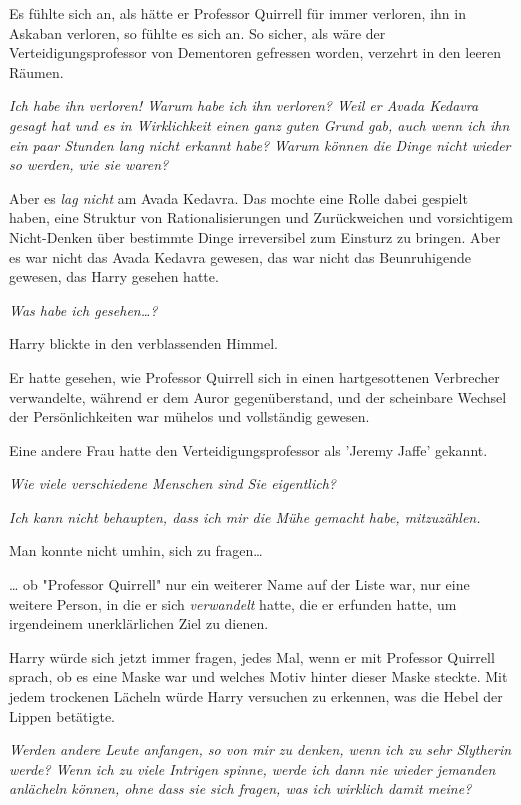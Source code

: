 {Es fühlte sich an, als hätte er Professor Quirrell für immer verloren, ihn in Askaban verloren, so fühlte es sich an. So sicher, als wäre der Verteidigungsprofessor von Dementoren gefressen worden, verzehrt in den leeren Räumen.

\emph{Ich habe ihn verloren! Warum habe ich ihn verloren? Weil er Avada Kedavra gesagt hat und es in Wirklichkeit einen ganz guten Grund gab, auch wenn ich ihn ein paar Stunden lang nicht erkannt habe? Warum können die Dinge nicht wieder so werden, wie sie waren?}

Aber es \emph{lag nicht} am Avada Kedavra. Das mochte eine Rolle dabei gespielt haben, eine Struktur von Rationalisierungen und Zurückweichen und vorsichtigem Nicht-Denken über bestimmte Dinge irreversibel zum Einsturz zu bringen. Aber es war nicht das Avada Kedavra gewesen, das war nicht das Beunruhigende gewesen, das Harry gesehen hatte.

\emph{Was habe ich gesehen…?}

Harry blickte in den verblassenden Himmel.

Er hatte gesehen, wie Professor Quirrell sich in einen hartgesottenen Verbrecher verwandelte, während er dem Auror gegenüberstand, und der scheinbare Wechsel der Persönlichkeiten war mühelos und vollständig gewesen.

Eine andere Frau hatte den Verteidigungsprofessor als 'Jeremy Jaffe' gekannt.

\emph{Wie viele verschiedene Menschen sind Sie eigentlich?}

\emph{Ich kann nicht behaupten, dass ich mir die Mühe gemacht habe, mitzuzählen.}

Man konnte nicht umhin, sich zu fragen…

… ob "Professor Quirrell" nur ein weiterer Name auf der Liste war, nur eine weitere Person, in die er sich \emph{verwandelt} hatte, die er erfunden hatte, um irgendeinem unerklärlichen Ziel zu dienen.

Harry würde sich jetzt immer fragen, jedes Mal, wenn er mit Professor Quirrell sprach, ob es eine Maske war und welches Motiv hinter dieser Maske steckte. Mit jedem trockenen Lächeln würde Harry versuchen zu erkennen, was die Hebel der Lippen betätigte.

\emph{Werden andere Leute anfangen, so von mir zu denken, wenn ich zu sehr Slytherin werde? Wenn ich zu viele Intrigen spinne, werde ich dann nie wieder jemanden anlächeln können, ohne dass sie sich fragen, was ich wirklich damit meine?}

}

